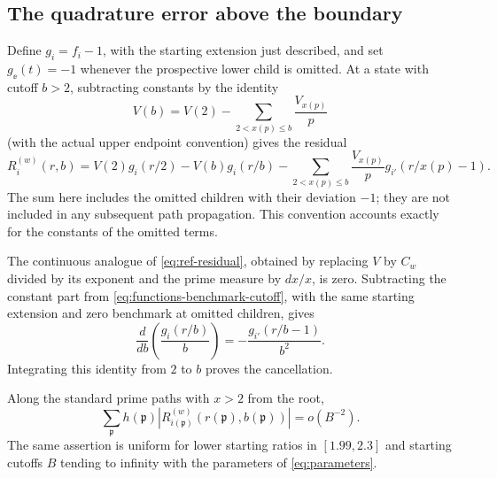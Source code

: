 \subsection{The quadrature error above the boundary}

Define $g_i=f_i-1$, with the starting extension just described, and set
$g_\ee(t)=-1$ whenever the prospective lower child is omitted.  At a
state with cutoff $b>2$, subtracting constants by the identity
\[
 V(b)=V(2)-\sum_{2<x(p)\leq b}\frac{V_{x(p)}}p
\]
(with the actual upper endpoint convention) gives the residual
\begin{equation}\label{eq:ref-residual}
 R_i^{(w)}(r,b)=V(2)g_i(r/2)-V(b)g_i(r/b)
       -\sum_{2<x(p)\leq b}\frac{V_{x(p)}}p
                          g_{i'}(r/x(p)-1).
\end{equation}
The sum here includes the omitted children with their deviation $-1$;
they are not included in any subsequent path propagation.  This
convention accounts exactly for the constants of the omitted terms.

The continuous analogue of \eqref{eq:ref-residual}, obtained by
replacing $V$ by $C_w$ divided by its exponent and the prime measure
by $dx/x$, is zero.  Subtracting the constant part from
\eqref{eq:functions-benchmark-cutoff}, with the same starting extension
and zero benchmark at omitted children, gives
\begin{equation}\label{eq:ref-differentiation}
 \frac{d}{db}\left(\frac{g_i(r/b)}b\right)
       =-\frac{g_{i'}(r/b-1)}{b^2}.
\end{equation}
Integrating this identity from $2$ to $b$ proves the cancellation.

\begin{lemma}\label{lem:ref-residual}
Along the standard prime paths with $x>2$ from the root,
\begin{equation}\label{eq:ref-residual-sum}
 \sum_{\mathfrak p}h(\mathfrak p)
       \left|R_{i(\mathfrak p)}^{(w)}
                   (r(\mathfrak p),b(\mathfrak p))\right|=o(B^{-2}).
\end{equation}
The same assertion is uniform for lower starting ratios in
$[1.99,2.3]$ and starting cutoffs $B$ tending to infinity with the
parameters of \eqref{eq:parameters}.
\end{lemma}


